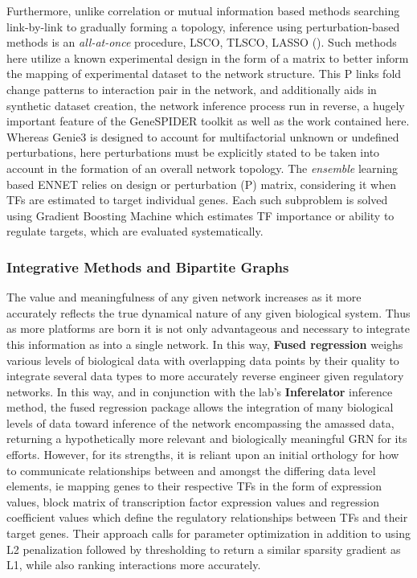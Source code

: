 Furthermore, unlike correlation or mutual information based methods searching link-by-link to gradually forming a topology, inference using perturbation-based methods is an {\it all-at-once} procedure, \ie LSCO, TLSCO, LASSO (). Such methods here utilize a known experimental design in the form of a matrix to better inform the mapping of experimental dataset to the network structure. This P links fold change patterns to interaction pair in the network, and additionally aids in synthetic dataset creation, the network inference process run in reverse, a hugely important feature of the GeneSPIDER toolkit as well as the work contained here. Whereas Genie3 is designed to account for multifactorial unknown or undefined perturbations, here perturbations must be explicitly stated to be taken into account in the formation of an overall network topology. 
The \emph{ensemble} learning based ENNET \citep{slawek2013ennet} relies on design or perturbation (P) matrix, considering it when TFs are estimated to target individual genes. Each such subproblem is solved using Gradient Boosting Machine which estimates TF importance or ability to regulate targets, which are evaluated systematically.

\subsubsection{Integrative Methods and Bipartite Graphs}
\label{sec:bipart}

The value and meaningfulness of any given network increases as it more accurately reflects the true dynamical nature of any given biological system. Thus as more platforms are born it is not only advantageous and necessary to integrate this information as into a single network. In this way, \textbf{Fused regression} \cite{lam2016fused} weighs various levels of biological data with overlapping data points by their quality to integrate several data types to more accurately reverse engineer given regulatory networks. In this way, and in conjunction with the lab's \textbf{Inferelator}\cite{bonneau2006inferelator} inference method, the fused regression package allows the integration of many biological levels of data toward inference of the network encompassing the amassed data, returning a hypothetically more relevant and biologically meaningful GRN for its efforts. However, for its strengths, it is reliant upon an initial orthology for how to communicate relationships between and amongst the differing data level elements, ie mapping genes to their respective TFs in the form of expression values, block matrix of transcription factor expression values and regression coefficient values which define the regulatory relationships between TFs and their target genes. Their approach  calls for parameter optimization in addition to using L2 penalization followed by thresholding to return a similar sparsity gradient as L1, while also ranking interactions more accurately.

